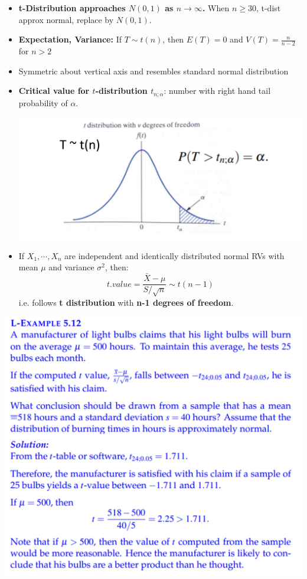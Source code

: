 \documentclass[12pt, landscape]{article}
\begin{document}
\begin{multicols*}{3}
\begin{itemize}
    \item \textbf{t-Distribution approaches $N(0,1)$ as $n \to \infty$.} When $n \geq 30$, t-dist approx normal, replace by $N(0,1)$.
    \item \textbf{Expectation, Variance:} If $T \sim t(n)$, then $E(T) = 0$ and $V(T) = \frac{n}{n-2}$ for $n > 2$
    \item Symmetric about vertical axis and resembles standard normal distribution
    \item \textbf{Critical value for $t$-distribution $t_{n; \alpha}$}: number with right hand tail probability of $\alpha$.
    \centerline{\includegraphics[width=0.7\linewidth]{tdist}}
    \item If $X_1, \cdots, X_n$ are independent and identically distributed normal RVs with mean $\mu$ and variance $\sigma^2$, then:
    \[t. value = \frac{\bar{X} - \mu}{S / \sqrt{n}} \sim t(n-1)\]
    i.e. follows \textbf{t distribution} with \textbf{n-1 degrees of freedom}.
\end{itemize}

\centerline{\includegraphics[width=0.9\linewidth]{tdist2}}


\end{multicols*}
\end{document}
